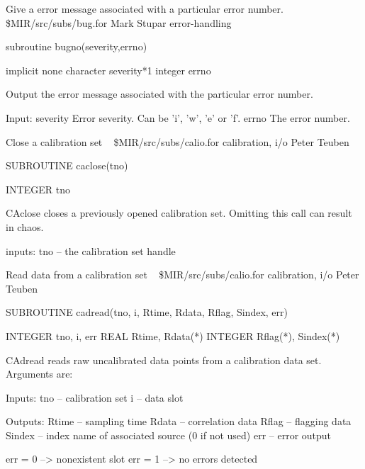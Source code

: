 %
\noindent Give a error message associated with a particular error number.
\newline \ 
\newline {} \$MIR/src/subs/bug.for
\newline {} Mark Stupar
\newline {} error-handling
\par{\tenpoint
{\eightpoint\begintt
        subroutine bugno(severity,errno)

        implicit none
        character severity*1
        integer errno

  Output the error message associated with the particular error number.

  Input:
    severity   Error severity. Can be 'i', 'w', 'e' or 'f'.
    errno      The error number.
\endtt}
\par}
%
\noindent Close a calibration set
\newline \ 
\newline {} \$MIR/src/subs/calio.for
\newline {} calibration, i/o
\newline \abox{Responsible:} Peter Teuben
\par{\tenpoint
{\eightpoint\begintt
        SUBROUTINE caclose(tno)

        INTEGER tno

    CAclose closes a previously opened calibration set.  Omitting this
    call can result in chaos.

       inputs:
           tno -- the calibration set handle
\endtt}
\par}
%
\noindent Read data from a calibration set
\newline \ 
\newline {} \$MIR/src/subs/calio.for
\newline \abox{Keywords:} calibration, i/o
\newline {} Peter Teuben
\par{\tenpoint
{\eightpoint\begintt
        SUBROUTINE cadread(tno, i, Rtime, Rdata, Rflag, Sindex, err)

        INTEGER tno, i, err
        REAL Rtime, Rdata(*)
        INTEGER Rflag(*), Sindex(*)

    CAdread reads raw uncalibrated data points from a calibration data
    set.  Arguments are:

  Inputs:
       tno     -- calibration set
       i       -- data slot

  Outputs:
       Rtime   -- sampling time
       Rdata   -- correlation data
       Rflag   -- flagging data
       Sindex  -- index name of associated source (0 if not used)
       err     -- error output

       err = 0 --> nonexistent slot
       err = 1 --> no errors detected
\endtt}
\par}
